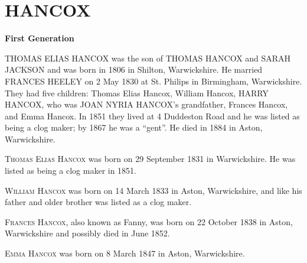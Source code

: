 \section{HANCOX}

\textbf{First Generation}

\uppercase{Thomas Elias Hancox} was the son of \uppercase{Thomas Hancox} and \uppercase{Sarah Jackson} and was born in 1806 in Shilton, Warwickshire.  He married \uppercase{Frances Heeley} on	2 May 1830 at St. Philips in	Birmingham, Warwickshire. They had five children: Thomas Elias Hancox, William Hancox, \uppercase{Harry Hancox}, who was \uppercase{Joan Nyria Hancox}'s grandfather, Frances Hancox, and Emma Hancox.  In 1851 they lived at 4 Duddeston Road and he was listed as being a clog maker; by 1867 he was a ``gent''. He died in 1884 in Aston, Warwickshire.

\textsc{Thomas Elias Hancox} was born on 29 September 1831 in	Warwickshire. He was listed as being a clog maker in 1851.

\textsc{William Hancox} was born on 14 March 1833 in Aston, Warwickshire, and like his father and older brother was listed as a clog maker.

\textsc{Frances Hancox}, also known as Fanny, was born on 22 October 1838 in Aston, Warwickshire and possibly died in June 1852.

\textsc{Emma Hancox} was born on	8 March 1847 in	Aston, Warwickshire.

